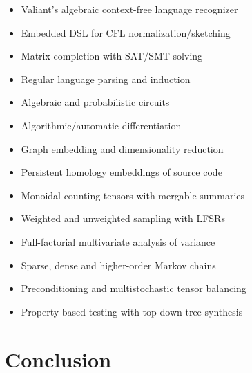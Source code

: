 \documentclass[sigplan,10pt,review,anonymous]{acmart}
\begin{document}
\begin{itemize}
  \item Valiant's algebraic context-free language recognizer~\citep{valiant1975general}
  \item Embedded DSL for CFL normalization/sketching~\citep{chomsky1959algebraic}
  \item Matrix completion with SAT/SMT solving
  \item Regular language parsing and induction
  \item Algebraic and probabilistic circuits~\citep{choi2020probabilistic}
  \item Algorithmic/automatic differentiation~\citep{considine2019kotlingrad}
  \item Graph embedding and dimensionality reduction~\citep{hamilton2020graph}
  \item Persistent homology embeddings of source code
  \item Monoidal counting tensors with mergable summaries
  \item Weighted and unweighted sampling with LFSRs~\citep{klein2013linear}
  \item Full-factorial multivariate analysis of variance
  \item Sparse, dense and higher-order Markov chains
  \item Preconditioning and multistochastic tensor balancing
  \item Property-based testing with top-down tree synthesis
\end{itemize}

\section{Conclusion}

\end{document}
